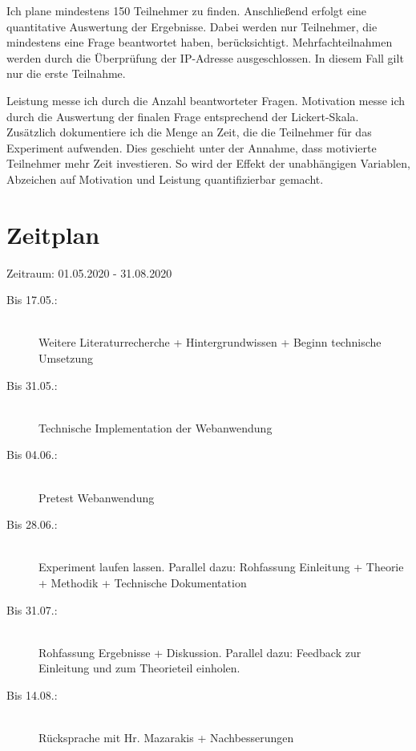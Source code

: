 \documentclass[
    a4paper,
    doc,
    12pt,
    natbib,
]{apa6}
\begin{document}
Ich plane mindestens 150 Teilnehmer zu finden. Anschließend erfolgt eine quantitative Auswertung der Ergebnisse. Dabei werden nur Teilnehmer, die mindestens eine Frage beantwortet haben, berücksichtigt. Mehrfachteilnahmen werden durch die Überprüfung der IP-Adresse ausgeschlossen. In diesem Fall gilt nur die erste Teilnahme. 

Leistung messe ich durch die Anzahl beantworteter Fragen. 
Motivation messe ich durch die Auswertung der finalen Frage entsprechend der Lickert-Skala. Zusätzlich dokumentiere ich die Menge an Zeit, die die Teilnehmer für das Experiment aufwenden. Dies geschieht unter der Annahme, dass motivierte Teilnehmer mehr Zeit investieren. So wird der Effekt der unabhängigen Variablen, Abzeichen auf Motivation und Leistung quantifizierbar gemacht.

\section{Zeitplan}

Zeitraum: 01.05.2020 - 31.08.2020

\begin{description}
\item[Bis 17.05.:]\hfill \\ Weitere Literaturrecherche + Hintergrundwissen + Beginn technische Umsetzung
\item[Bis 31.05.:]\hfill \\ Technische Implementation der Webanwendung
\item[Bis 04.06.:]\hfill \\ Pretest Webanwendung
\item[Bis 28.06.:]\hfill \\ Experiment laufen lassen. Parallel dazu: Rohfassung Einleitung + Theorie + Methodik + Technische Dokumentation
\item[Bis 31.07.:]\hfill \\ Rohfassung Ergebnisse + Diskussion. Parallel dazu: Feedback zur Einleitung und zum Theorieteil einholen. 
\item[Bis 14.08.:]\hfill \\  Rücksprache mit Hr. Mazarakis + Nachbesserungen

\end{description}


\end{document}
